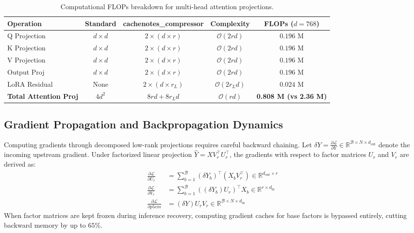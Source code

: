 \begin{table}[H]
\centering
\small
\begin{tabular}{lcccc}
\toprule
\textbf{Operation} & \textbf{Standard} & \textbf{cachenotes\_compressor} & \textbf{Complexity} & \textbf{FLOPs ($d=768$)} \\
\midrule
Q Projection & $d \times d$ & $2 \times (d \times r)$ & $\mathcal{O}(2rd)$ & $0.196$ M \\
K Projection & $d \times d$ & $2 \times (d \times r)$ & $\mathcal{O}(2rd)$ & $0.196$ M \\
V Projection & $d \times d$ & $2 \times (d \times r)$ & $\mathcal{O}(2rd)$ & $0.196$ M \\
Output Proj & $d \times d$ & $2 \times (d \times r)$ & $\mathcal{O}(2rd)$ & $0.196$ M \\
LoRA Residual & None & $2 \times (d \times r_L)$ & $\mathcal{O}(2r_L d)$ & $0.024$ M \\
\midrule
\textbf{Total Attention Proj} & $4 d^2$ & $8rd + 8r_L d$ & $\mathcal{O}(rd)$ & \textbf{0.808 M (vs 2.36 M)} \\
\bottomrule
\end{tabular}
\caption{Computational FLOPs breakdown for multi-head attention projections.}
\end{table}

\subsection{Gradient Propagation and Backpropagation Dynamics}
Computing gradients through decomposed low-rank projections requires careful backward chaining. Let $\delta Y = \frac{\partial \mathcal{L}}{\partial Y} \in \mathbb{R}^{\mathcal{B} \times N \times d_{\text{out}}}$ denote the incoming upstream gradient. Under factorized linear projection $\hat{Y} = X V_r^\top U_r^\top$, the gradients with respect to factor matrices $U_r$ and $V_r$ are derived as:
\begin{align}
\frac{\partial \mathcal{L}}{\partial U_r} &= \sum_{b=1}^{\mathcal{B}} (\delta Y_b)^\top (X_b V_r^\top) \in \mathbb{R}^{d_{\text{out}} \times r} \\
\frac{\partial \mathcal{L}}{\partial V_r} &= \sum_{b=1}^{\mathcal{B}} ((\delta Y_b) U_r)^\top X_b \in \mathbb{R}^{r \times d_{\text{in}}} \\
\frac{\partial \mathcal{L}}{\partial p{5cm}} &= (\delta Y) U_r V_r \in \mathbb{R}^{\mathcal{B} \times N \times d_{\text{in}}}
\end{align}
When factor matrices are kept frozen during inference recovery, computing gradient caches for base factors is bypassed entirely, cutting backward memory by up to $65\%$.

